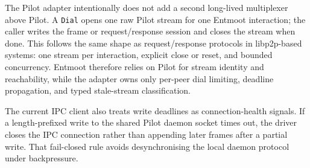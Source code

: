 \documentclass[11pt,a4paper,twocolumn]{article}
\begin{document}
The Pilot adapter intentionally does not add a second long-lived
multiplexer above Pilot. A \texttt{Dial} opens one raw Pilot stream for
one Entmoot interaction; the caller writes the frame or request/response
session and closes the stream when done. This follows the same shape as
request/response protocols in libp2p-based systems: one stream per
interaction, explicit close or reset, and bounded concurrency. Entmoot
therefore relies on Pilot for stream identity and reachability, while
the adapter owns only per-peer dial limiting, deadline propagation, and
typed stale-stream classification.

The current IPC client also treats write deadlines as connection-health
signals. If a length-prefixed write to the shared Pilot daemon socket
times out, the driver closes the IPC connection rather than appending
later frames after a partial write. That fail-closed rule avoids
desynchronising the local daemon protocol under backpressure.
\end{document}
